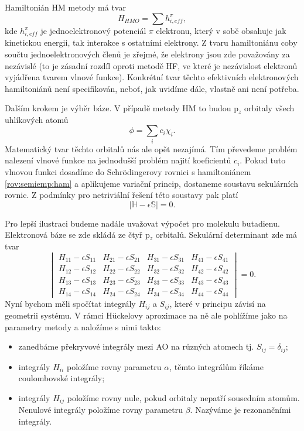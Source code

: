 Hamiltonián HM metody má tvar
\begin{equation}
H_{HMO}= \sum h_{i, eff}^\pi,
\label{rov:semiemp:ham}
\end{equation}
kde $h_{i, eff}^\pi$ je jednoelektronový potenciál $\pi$ elektronu, který v sobě obsahuje jak kinetickou energii, tak interakce s ostatními elektrony.
Z tvaru hamiltoniánu coby součtu jednoelektronových členů je zřejmé, že elektrony jsou zde považovány za nezávislé (to je zásadní rozdíl oproti metodě HF, ve které je nezávislost elektronů vyjádřena  tvarem vlnové funkce). 
Konkrétní tvar těchto efektivních elektronových hamiltoniánů není specifikován, neboť, jak uvidíme dále, vlastně ani není potřeba. 

Dalším krokem je výběr báze. V případě metody HM to budou p$_z$ orbitaly všech uhlíkových atomů
\begin{equation}
\phi= \sum_i c_i \chi_i.
\label{rov:HM_MO}
\end{equation}
Matematický tvar těchto orbitalů nás ale opět nezajímá. Tím převedeme problém nalezení vlnové funkce na jednodušší problém najití koeficientů $c_i$. Pokud tuto vlnovou funkci dosadíme do Schr\"{o}dingerovy rovnici s hamiltoniánem \eqref{rov:semiemp:ham} a aplikujeme variační princip, dostaneme soustavu sekulárních rovnic. Z podmínky pro netriviální řešení této soustavy pak platí
\begin{equation}
|\mathbb{H}-\epsilon \mathbb{S}|=0 .
\label{rov:HM_det}
\end{equation}

Pro lepší ilustraci budeme nadále uvažovat výpočet pro molekulu butadienu.
Elektronová báze se zde skládá ze čtyř p$_z$ orbitalů. Sekulární determinant zde má tvar
\begin{equation}
\begin{vmatrix}
H_{11}-\epsilon S_{11} & H_{21}-\epsilon S_{21} & H_{31}-\epsilon S_{31} & H_{41}-\epsilon S_{41}  \\
H_{12}-\epsilon S_{12} & H_{22}-\epsilon S_{22} & H_{32}-\epsilon S_{32} & H_{42}-\epsilon S_{42}  \\
H_{13}-\epsilon S_{13} & H_{23}-\epsilon S_{23} & H_{33}-\epsilon S_{33} & H_{43}-\epsilon S_{43}  \\
H_{14}-\epsilon S_{14} & H_{24}-\epsilon S_{24} & H_{34}-\epsilon S_{34} & H_{44}-\epsilon S_{44}
\end{vmatrix}
= 0 .
\end{equation}
Nyní bychom měli spočítat integrály $H_{ij}$ a $S_{ij}$, které v principu závisí na geometrii systému.
V rámci H\"{u}ckelovy aproximace na ně ale pohlížíme jako na parametry metody
a naložíme s nimi takto:
\begin{itemize}
\item zanedbáme překryvové integrály mezi AO na různých atomech tj. $S_{ij}=\delta_{ij}$;
\item integrály $H_{ii}$ položíme rovny parametru $\alpha$, těmto integrálům říkáme coulombovské integrály;
\item integrály $H_{ij}$ položíme rovny nule, pokud orbitaly nepatří sousedním atomům.
Nenulové integrály položíme rovny parametru $\beta$. Nazýváme je rezonančními integrály.
\end{itemize}


